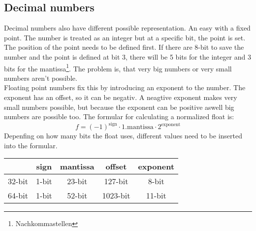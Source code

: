 \documentclass[a4paper]{scrartcl}
\begin{document}
        \subsection*{Decimal numbers}
        Decimal numbers also have different possible representation. An easy with a fixed point. The number is treated as an integer but at a specific bit, the point is 
        set. The position of the point needs to be defined first. If there are 8-bit to save the number and the point is defined at bit 3, there will be 5 bits for the integer
        and 3 bits for the mantissa\footnote{Nachkommastellen}. The problem is, that very big numbers or very small numbers aren't possible. \\
        Floating point numbers fix this by introducing an exponent to the number. The exponent has an offset, so it can be negativ. A neagtive exponent makes very small numbers
        possible, but because the exponent can be positive aswell big numbers are possible too. The formular for calculating a normalized float is:
        \begin{equation*}
            f = (-1)^{\text{sign}} \cdot 1.\text{mantissa} \cdot 2^{\text{exponent}}
        \end{equation*}  
        Depenfing on how many bits the float uses, different values need to be inserted into the formular.
        \begin{center}\begin{tabular}{|c|c|c|c|c|}
            \hline
             & sign & mantissa & offset & exponent \\
            \hline
            32-bit & 1-bit & 23-bit & 127-bit & 8-bit \\
            \hline
            64-bit & 1-bit & 52-bit & 1023-bit & 11-bit \\
            \hline
        \end{tabular}\end{center}
        
\end{document}
